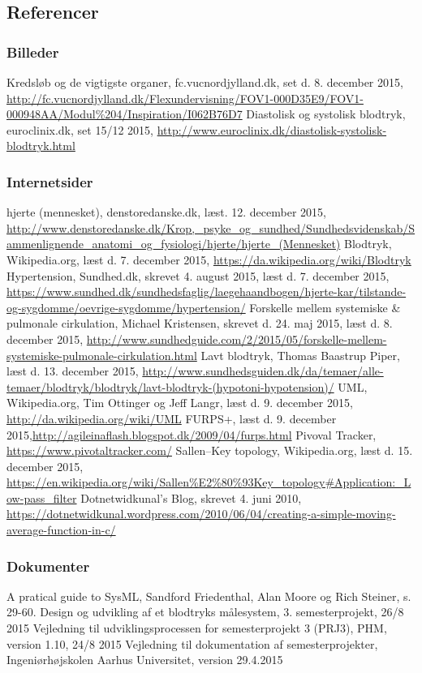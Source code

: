 \begin{thebibliography}{99}
\section{Referencer}
\subsubsection{Billeder}
Kredsløb og de vigtigste organer, fc.vucnordjylland.dk, set d. 8. december 2015, \url{http://fc.vucnordjylland.dk/Flexundervisning/FOV1-000D35E9/FOV1-000948AA/Modul\%204/Inspiration/I062B76D7}
Diastolisk og systolisk blodtryk, euroclinix.dk, set 15/12 2015, \url{http://www.euroclinix.dk/diastolisk-systolisk-blodtryk.html}
\subsubsection{Internetsider}
hjerte (mennesket), denstoredanske.dk, læst. 12. december 2015, \url{http://www.denstoredanske.dk/Krop,_psyke_og_sundhed/Sundhedsvidenskab/Sammenlignende_anatomi_og_fysiologi/hjerte/hjerte_(Mennesket)}
Blodtryk, Wikipedia.org, læst d. 7. december 2015, \url{https://da.wikipedia.org/wiki/Blodtryk}
Hypertension, Sundhed.dk, skrevet 4. august 2015, læst d. 7. december 2015,
\url{https://www.sundhed.dk/sundhedsfaglig/laegehaandbogen/hjerte-kar/tilstande-og-sygdomme/oevrige-sygdomme/hypertension/}
Forskelle mellem systemiske \& pulmonale cirkulation, Michael Kristensen, skrevet d. 24. maj 2015, læst d. 8. december 2015, \url{http://www.sundhedguide.com/2/2015/05/forskelle-mellem-systemiske-pulmonale-cirkulation.html}
Lavt blodtryk, Thomas Baastrup Piper, læst d. 13. december 2015, \url{http://www.sundhedsguiden.dk/da/temaer/alle-temaer/blodtryk/blodtryk/lavt-blodtryk-(hypotoni-hypotension)/}
UML, Wikipedia.org, Tim Ottinger og Jeff Langr, læst d. 9. december 2015, \url{http://da.wikipedia.org/wiki/UML}
FURPS+, læst d. 9. december 2015,\url{http://agileinaflash.blogspot.dk/2009/04/furps.html}
Pivoval Tracker, \url{https://www.pivotaltracker.com/}
Sallen–Key topology, Wikipedia.org, læst d. 15. december 2015, \url{https://en.wikipedia.org/wiki/Sallen\%E2\%80\%93Key_topology#Application:_Low-pass_filter}
Dotnetwidkunal's Blog, skrevet 4. juni 2010,
\url{https://dotnetwidkunal.wordpress.com/2010/06/04/creating-a-simple-moving-average-function-in-c/}
\subsubsection{Dokumenter}
A pratical guide to SysML, Sandford Friedenthal, Alan Moore og Rich Steiner, s. 29-60.
Design og udvikling af et blodtryks målesystem, 3. semesterprojekt, 26/8 2015
Vejledning til udviklingsprocessen for semesterprojekt 3 (PRJ3), PHM, version 1.10, 24/8 2015
Vejledning til dokumentation af semesterprojekter, Ingeniørhøjskolen Aarhus Universitet, version 29.4.2015
\end{thebibliography}